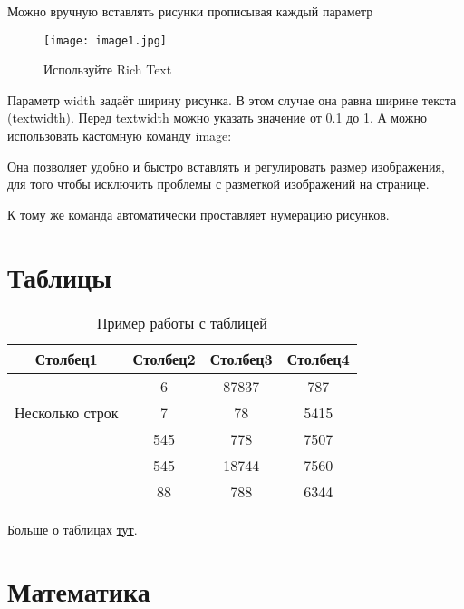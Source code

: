 Можно вручную вставлять рисунки прописывая каждый параметр

\begin{figure}[!htb]
	\centering
	\texttt{[image: image1.jpg]}
	\caption{Используйте Rich Text}
	\label{fig:image1}
\end{figure}

Параметр width задаёт ширину рисунка. В этом случае она равна ширине текста (textwidth). Перед textwidth можно указать значение от 0.1 до 1.
А можно использовать кастомную команду image:


Она позволяет удобно и быстро вставлять и регулировать размер изображения, для того чтобы исключить проблемы с разметкой изображений на странице.



К тому же команда автоматически проставляет нумерацию рисунков.
\section{Таблицы}

\begin{table}[h!]
\centering
\begin{tabular}{|c|c|c|c|} 
 \hline
 Столбец1 & Столбец2 & Столбец3 & Столбец4 \\ [0.5ex] 
 \hline
 \multirow{3}{5em}{Несколько строк} & 6 & 87837 & 787 \\ 
  &  7 & 78 & 5415 \\
   & 545 & 778 & 7507 \\
   & 545 & 18744 & 7560 \\
   & 88 & 788 & 6344 \\ [1ex] 
 \hline
\end{tabular}
\caption{Пример работы с таблицей}
\label{table:1}
\end{table}


Больше о таблицах \href{https://www.overleaf.com/learn/latex/Tables}{тут}.

\section{Математика}

